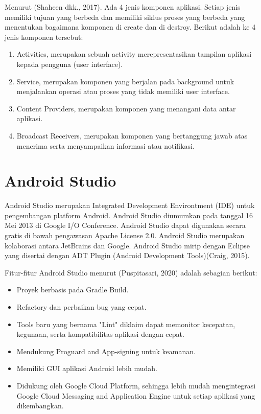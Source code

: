\par Menurut (Shaheen dkk., 2017). Ada 4 jenis komponen aplikasi. Setiap jenis memiliki tujuan yang berbeda dan memiliki siklus proses yang berbeda yang menentukan bagaimana komponen di create dan di destroy. Berikut adalah ke 4 jenis komponen tersebut:

\begin{enumerate}
\item Activities, merupakan sebuah activity merepresentasikan tampilan aplikasi kepada pengguna (user interface).
\item Service, merupakan komponen yang berjalan pada background untuk menjalankan operasi atau proses yang tidak memiliki user interface.
\item Content Providers, merupakan komponen yang menangani data antar aplikasi.
\item Broadcast Receivers, merupakan komponen yang bertanggung jawab atas menerima serta menyampaikan informasi atau notifikasi.
\end{enumerate}
\section{Android Studio}
Android Studio merupakan Integrated Development Environtment (IDE) untuk pengembangan platform Android. Android Studio diumumkan pada tanggal 16 Mei 2013 di Google I/O Conference. Android Studio dapat digunakan secara gratis di bawah pengawasan Apache License 2.0. Android Studio merupakan kolaborasi antara JetBrains dan Google. Android Studio mirip dengan Eclipse yang disertai dengan ADT Plugin (Android Development Tools)(Craig, 2015).

\par Fitur-fitur Android Studio menurut (Puspitasari, 2020) adalah sebagian berikut:
\begin{itemize}
\item Proyek berbasis pada Gradle Build.
\item Refactory dan perbaikan bug yang cepat.
\item Tools baru yang bernama "Lint" diklaim dapat memonitor kecepatan, kegunaan, serta kompatibilitas aplikasi dengan cepat.
\item Mendukung Proguard and App-signing untuk keamanan.
\item Memiliki GUI aplikasi Android lebih mudah.
\item Didukung oleh Google Cloud Platform, sehingga lebih mudah mengintegrasi Google Cloud Messaging and Application Engine untuk setiap aplikasi yang dikembangkan.

\end{itemize}
